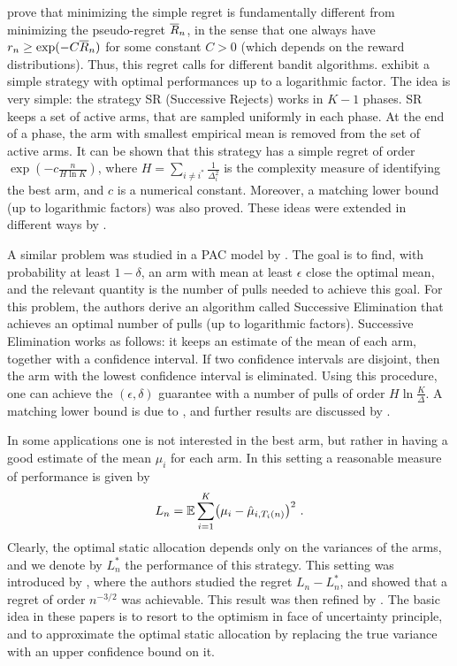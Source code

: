 \cite{BMS09} prove that minimizing the simple regret is fundamentally different from minimizing the pseudo-regret $\overline{R}_n$, in the sense that one always have $r_n \geq \exp(- C \overline{R}_n)$ for some constant $C>0$ (which depends on the reward distributions). Thus, this regret calls for different bandit algorithms. \cite{ABM10} exhibit a simple strategy with optimal performances up to a logarithmic factor. The idea is very simple: the strategy SR (Successive Rejects) works in $K-1$ phases. SR keeps a set of active arms, that are sampled uniformly in each phase. At the end of a phase, the arm with smallest empirical mean is removed from the set of active arms. It can be shown that this strategy has a simple regret of order $\exp\left(- c \frac{n}{H \ln K}\right)$, where $H = \sum_{i \neq i^*} \frac{1}{\Delta_i^2}$ is the complexity measure of identifying the best arm, and $c$ is a numerical constant. Moreover, a matching lower bound (up to logarithmic factors) was also proved. These ideas were extended in different ways by \cite{GGLB11, BJM11, BWV12}.

A similar problem was studied in a PAC model by \cite{EMM02}. The goal is to find, with probability at least $1-\delta$, an arm with mean at least $\epsilon$ close the optimal mean, and the relevant quantity is the number of pulls needed to achieve this goal. For this problem, the authors derive an algorithm called Successive Elimination that achieves an optimal number of pulls (up to logarithmic factors). Successive Elimination works as follows: it keeps an estimate of the mean of each arm, together with a confidence interval. If two confidence intervals are disjoint, then the arm with the lowest confidence interval is eliminated. Using this procedure, one can achieve the $(\epsilon, \delta)$ guarantee with a number of pulls of order $H \ln \tfrac{K}{\Delta}$. A matching lower bound is due to \cite{MT04}, and further results are discussed by \cite{EMM06}.

In some applications one is not interested in the best arm, but rather in having a good estimate of the mean $\mu_i$ for each arm. In this setting a reasonable measure of performance is given by
$$L_n = \mathbb{E} \sum_{i=1}^K \bigl(\mu_i - \hat{\mu}_{i,T_i(n)}\bigr)^2~.$$
Clearly, the optimal static allocation depends only on the variances of the arms, and we denote by $L_n^*$ the performance of this strategy. 
This setting was introduced by \cite{AGS08}, where the authors studied the regret $L_n - L_n^*$, and showed that a regret of order $n^{-3/2}$ was achievable. This result was then refined by \cite{CLGMA11, CM11}. The basic idea in these papers is to resort to the optimism in face of uncertainty principle, and to approximate the optimal static allocation by replacing the true variance with an upper confidence bound on it.


